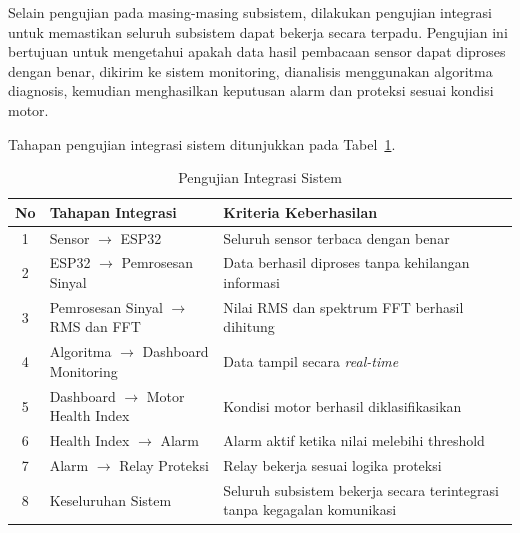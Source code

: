 \documentclass{elsinta}
\begin{document}
Selain pengujian pada masing-masing subsistem, dilakukan pengujian integrasi untuk memastikan seluruh subsistem dapat bekerja secara terpadu. Pengujian ini bertujuan untuk mengetahui apakah data hasil pembacaan sensor dapat diproses dengan benar, dikirim ke sistem monitoring, dianalisis menggunakan algoritma diagnosis, kemudian menghasilkan keputusan alarm dan proteksi sesuai kondisi motor.

Tahapan pengujian integrasi sistem ditunjukkan pada Tabel~\ref{tab:integrasi_sistem}.

\begin{table}[H]
\centering
\caption{Pengujian Integrasi Sistem}
\label{tab:integrasi_sistem}
\renewcommand{\arraystretch}{1.3}

\begin{tabular}{|c|p{6cm}|p{7cm}|}
\hline
\textbf{No} &
\centering\textbf{Tahapan Integrasi} &
\centering\arraybackslash\textbf{Kriteria Keberhasilan}\\
\hline

1 &
Sensor $\rightarrow$ ESP32 &
Seluruh sensor terbaca dengan benar\\
\hline

2 &
ESP32 $\rightarrow$ Pemrosesan Sinyal &
Data berhasil diproses tanpa kehilangan informasi\\
\hline

3 &
Pemrosesan Sinyal $\rightarrow$ RMS dan FFT &
Nilai RMS dan spektrum FFT berhasil dihitung\\
\hline

4 &
Algoritma $\rightarrow$ Dashboard Monitoring &
Data tampil secara \textit{real-time}\\
\hline

5 &
Dashboard $\rightarrow$ Motor Health Index &
Kondisi motor berhasil diklasifikasikan\\
\hline

6 &
Health Index $\rightarrow$ Alarm &
Alarm aktif ketika nilai melebihi threshold\\
\hline

7 &
Alarm $\rightarrow$ Relay Proteksi &
Relay bekerja sesuai logika proteksi\\
\hline

8 &
Keseluruhan Sistem &
Seluruh subsistem bekerja secara terintegrasi tanpa kegagalan komunikasi\\
\hline

\end{tabular}
\end{table}
\end{document}
